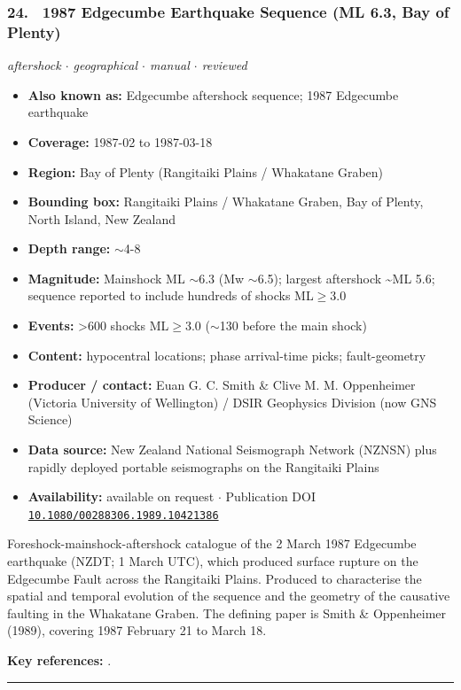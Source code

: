 \documentclass[10pt,a4paper]{article}
\newcommand{\catentryrule}{\par\vspace{3pt}\noindent\textcolor{rulegrey}{\rule{\linewidth}{0.3pt}}\par\vspace{5pt}}
\newcommand{\kv}[2]{\item \textbf{#1:} #2}
\begin{document}
\subsubsection*{\hypertarget{c:24}{24.}~ 1987 Edgecumbe Earthquake Sequence (ML 6.3, Bay of Plenty)}
{\small\itshape aftershock $\cdot$ geographical $\cdot$ manual $\cdot$ reviewed}\par\vspace{2pt}
\begin{itemize}[leftmargin=1.3em,itemsep=0.6pt,topsep=1pt,parsep=0pt]
\kv{Also known as}{Edgecumbe aftershock sequence; 1987 Edgecumbe earthquake}
\kv{Coverage}{1987-02 to 1987-03-18}
\kv{Region}{Bay of Plenty (Rangitaiki Plains / Whakatane Graben)}
\kv{Bounding box}{Rangitaiki Plains / Whakatane Graben, Bay of Plenty, North Island, New Zealand}
\kv{Depth range}{$\sim$4-8}
\kv{Magnitude}{Mainshock ML $\sim$6.3 (Mw $\sim$6.5); largest aftershock \textasciitilde{}ML 5.6; sequence reported to include hundreds of shocks ML$\geq$3.0}
\kv{Events}{\textgreater{}600 shocks ML$\geq$3.0 ($\sim$130 before the main shock)}
\kv{Content}{hypocentral locations; phase arrival-time picks; fault-geometry}
\kv{Producer / contact}{Euan G. C. Smith \& Clive M. M. Oppenheimer (Victoria University of Wellington) / DSIR Geophysics Division (now GNS Science)}
\kv{Data source}{New Zealand National Seismograph Network (NZNSN) plus rapidly deployed portable seismographs on the Rangitaiki Plains}
\kv{Availability}{available on request $\cdot$ Publication DOI \href{https://doi.org/10.1080/00288306.1989.10421386}{\nolinkurl{10.1080/00288306.1989.10421386}}}
\end{itemize}
\par\vspace{2pt}Foreshock-mainshock-aftershock catalogue of the 2 March 1987 Edgecumbe earthquake (NZDT; 1 March UTC), which produced surface rupture on the Edgecumbe Fault across the Rangitaiki Plains. Produced to characterise the spatial and temporal evolution of the sequence and the geometry of the causative faulting in the Whakatane Graben. The defining paper is Smith \& Oppenheimer (1989), covering 1987 February 21 to March 18.
\par\vspace{2pt}\textbf{Key references:} \cite{Smith1989}.
\catentryrule
\end{document}
